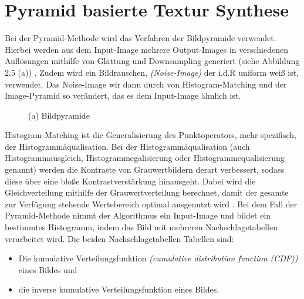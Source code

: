 \documentclass[12pt, a4paper,twoside,openright]{report} %
\begin{document}
\section{Pyramid basierte Textur Synthese}

Bei der Pyramid-Methode wird das Verfahren der Bildpyramide verwendet.
Hierbei werden aus dem Input-Image mehrere Output-Images in verschiedenen Auflösungen mithilfe von Glättung und Downsampling generiert {(siehe Abbildung 2.5 (a))} \cite{Heeger}.
\newline
Zudem wird ein Bildrauschen, \textit{(Noise-Image)} der i.d.R uniform weiß ist, verwendet.
Das Noise-Image wir dann durch von Histogram-Matching und der Image-Pyramid so verändert, das es dem Input-Image ähnlich ist.

\begin{figure}[H]
    \centering
    \caption{(a) Bildpyramide}%
\end{figure}

Histogram-Matching ist die Generalisierung des Punktoperators, mehr spezifisch, der Histogrammäqualisation.
Bei der Histogrammäqualisation {(auch Histogrammausgleich, Histogrammegalisierung oder Histogrammequalisierung genannt)}
werden die Kontraste von Grauwertbildern derart verbessert, sodass diese über eine bloße Kontrastverstärkung hinausgeht.
Dabei wird die Gleichverteilung mithilfe der Grauwertverteilung berechnet, damit der gesamte zur Verfügung stehende Wertebereich optimal ausgenutzt wird \cite{Lehmann2013}.
Bei dem Fall der Pyramid-Methode nimmt der Algorithmus ein Input-Image und bildet ein bestimmtes Histogramm, indem das Bild mit mehreren Nachschlagetabellen verarbeitet wird.
Die beiden Nachschlagetabellen Tabellen sind:

\begin{itemize}
    \itemsep-0.5em
    \item Die kumulative Verteilungsfunktion \textit{(cumulative distribution function (CDF))} eines Bildes und
    \item die inverse kumulative Verteilungsfunktion eines Bildes.
\end{itemize} 
\end{document}
